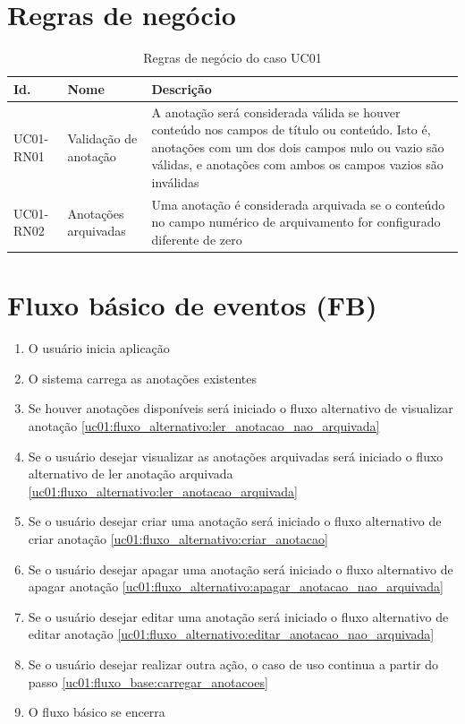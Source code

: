 \documentclass[
	12pt,				%
	oneside,			%
	a4paper,			%
	english,			%
	brazil,				%
	]{abntex2}
\begin{document}
\section{Regras de negócio}
\IBGEtabfontsize
\begin{longtable}{@{}lp{}p{}@{}}
\caption{Regras de negócio do caso UC01}
\label{tab:regras_de_negocio} \\
\toprule
\textbf{Id.} & \textbf{Nome} & \textbf{Descrição} \\ \midrule
\label{uc01:rn01_validacao_anotacao} UC01-RN01   & Validação de anotação & A anotação será considerada válida se houver conteúdo nos campos de título ou conteúdo. Isto é, anotações com um dos dois campos nulo ou vazio são válidas, e anotações com ambos os campos vazios são inválidas \\ \midrule
\label{uc01:rn02_flag_arquivar} UC01-RN02  & Anotações arquivadas & Uma anotação é considerada arquivada se o conteúdo no campo numérico de arquivamento for configurado diferente de zero \\ \bottomrule
\end{longtable}

\section{Fluxo básico de eventos (FB)}

\begin{enumerate}
    \item O usuário inicia aplicação
    \item O sistema carrega as anotações existentes \label{uc01:fluxo_base:carregar_anotacoes}
    \item Se houver anotações disponíveis será iniciado o fluxo alternativo de visualizar anotação \ref{uc01:fluxo_alternativo:ler_anotacao_nao_arquivada}
    \item Se o usuário desejar visualizar as anotações arquivadas será iniciado o fluxo alternativo de ler anotação arquivada \ref{uc01:fluxo_alternativo:ler_anotacao_arquivada}
    \item Se o usuário desejar criar uma anotação será iniciado o fluxo alternativo de criar anotação \ref{uc01:fluxo_alternativo:criar_anotacao}
    \item Se o usuário desejar apagar uma anotação será iniciado o fluxo alternativo de apagar anotação \ref{uc01:fluxo_alternativo:apagar_anotacao_nao_arquivada}
    \item Se o usuário desejar editar uma anotação será iniciado o fluxo alternativo de editar anotação \ref{uc01:fluxo_alternativo:editar_anotacao_nao_arquivada}
    \item Se o usuário desejar realizar outra ação, o caso de uso continua a partir do passo \ref{uc01:fluxo_base:carregar_anotacoes}
    \item O fluxo básico se encerra
\end{enumerate}
\end{document}
